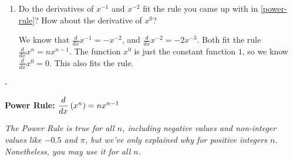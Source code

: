 \documentclass{article}
\makeatletter
\newlength{\tipmargin}
\renewenvironment{framed}{
  \setlength{\tipmargin}{\textwidth-\linewidth}
  \advance\@totalleftmargin-\tipmargin
  \def\FrameCommand{\hspace{\tipmargin}\fbox}%
  \advance\linewidth\tipmargin
  \MakeFramed {\advance\hsize-\width \FrameRestore}%
}
{\endMakeFramed}
\makeatother
\begin{document}
\begin{enumerate}
\item 
  \begin{problem}[\nstretch{0.5}]
    Do the derivatives of $x^{-1}$ and $x^{-2}$ fit the rule you came up with in \ref{power-rule}? How about the derivative of $x^0$?
  \end{problem}

  \begin{solution}
    We know that $\frac{d}{dx}x^{-1}=-x^{-2}$, and
    $\frac{d}{dx}x^{-2}=-2x^{-3}$. Both fit the rule 
    $\frac{d}{dx}x^n = nx^{n-1}$.  The function $x^0$ is
    just the constant function $1$, so we know $\frac{d}{dx}x^0 = 0$.
    This also fits the rule.
  \end{solution}

\end{enumerate}
\begin{framed}
  \textbf{Power Rule:} $\dfrac{d}{dx} \left( x^n \right) = nx^{n-1}$

  \emph{The Power Rule is true for all $n$, including negative values and non-integer values like $-0.5$ and $\pi$, but we've only explained why for positive integers $n$. Nonetheless, you may use it for all $n$.}
\end{framed}
\end{document}
